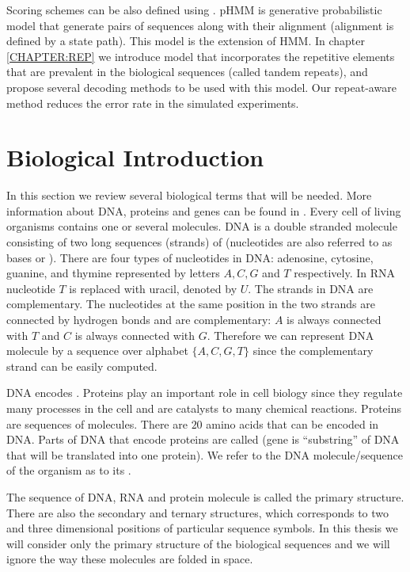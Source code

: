 Scoring schemes can be also defined using .  pHMM is generative probabilistic model that generate pairs of
sequences along with their alignment (alignment is defined by a state path).
This model is the extension of HMM. In chapter \ref{CHAPTER:REP} we introduce
model that incorporates the repetitive elements that are prevalent in the
biological sequences (called tandem repeats), and propose several decoding
methods to be used with this model. Our repeat-aware method reduces the error
rate in the simulated experiments. 

\section{Biological Introduction}\label{SECTION:BIOINTRO}

In this section we review several biological terms that will be needed. More
information about DNA, proteins and genes can be found in
\cite{BiologyForDummies, UnderstandingBioinformatics}. Every cell of living
organisms contains one or several  molecules. DNA is a double
stranded molecule consisting of two long sequences (strands) of
 (nucleotides are also referred to as bases or
). There are four types of nucleotides in DNA: adenosine,
cytosine, guanine, and thymine represented by letters $A,C,G$ and $T$
respectively. In RNA nucleotide $T$ is replaced with uracil, denoted by $U$.
The strands in DNA are complementary. The nucleotides at the same position in
the two strands are connected by hydrogen bonds and are complementary: $A$ is
always connected with $T$ and $C$ is always connected with $G$. Therefore we
can represent DNA molecule by a sequence over alphabet $\{A,C,G,T\}$ since the
complementary strand can be easily computed.

DNA encodes . Proteins play an important role in cell
biology since  they regulate many processes in the cell and are catalysts to
many chemical reactions. Proteins are sequences of 
molecules. There are $20$ amino acids that can be encoded in DNA. Parts of DNA
that encode proteins are called  (gene is ``substring'' of
DNA that will be translated into one protein). We refer to the DNA
molecule/sequence of the organism as to its .

The sequence of DNA, RNA and protein molecule is called the primary structure.
There are also the secondary and ternary structures, which corresponds to two
and three dimensional positions of particular sequence symbols. In this thesis
we will consider only the primary structure of the biological sequences and we
will ignore the way these molecules are folded in space.

